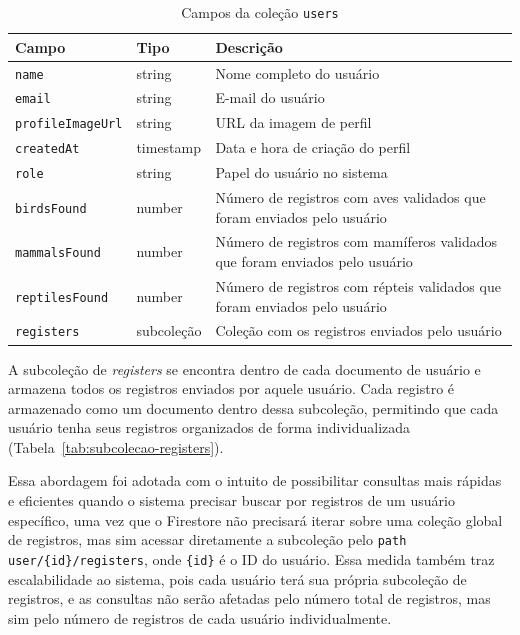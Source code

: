 \begin{table}[H]
    \centering
    \caption{Campos da coleção \texttt{users}}
    \label{tab:firestore-users}
    \begin{tabular}{|>{\raggedright\arraybackslash}p{3.5cm}|
                    >{\raggedright\arraybackslash}p{2cm}|
                    >{\raggedright\arraybackslash}p{7cm}|}
        \hline
        \textbf{Campo} & \textbf{Tipo} & \textbf{Descrição} \\ \hline
        \texttt{name} & string & Nome completo do usuário \\ \hline
        \texttt{email} & string & E-mail do usuário \\ \hline
        \texttt{profileImageUrl} & string & URL da imagem de perfil \\ \hline
        \texttt{createdAt} & timestamp & Data e hora de criação do perfil \\ \hline
        \texttt{role} & string & Papel do usuário no sistema \\ \hline
        \texttt{birdsFound} & number & Número de registros com aves validados que foram enviados pelo usuário \\ \hline
        \texttt{mammalsFound} & number & Número de registros com mamíferos validados que foram enviados pelo usuário \\ \hline
        \texttt{reptilesFound} & number & Número de registros com répteis validados que foram enviados pelo usuário \\ \hline
        \texttt{registers} & subcoleção & Coleção com os registros enviados pelo usuário \\ \hline
    \end{tabular}
\end{table}

A subcoleção de \textit{registers} se encontra dentro de cada documento de usuário e armazena
todos os registros enviados por aquele usuário. Cada registro é armazenado como um documento
dentro dessa subcoleção, permitindo que cada usuário tenha seus registros 
organizados de forma individualizada (Tabela~\ref{tab:subcolecao-registers}).

Essa abordagem foi adotada com o intuito de possibilitar consultas mais 
rápidas e eficientes quando o sistema precisar buscar por registros de um 
usuário específico, uma vez que o Firestore não precisará iterar sobre uma coleção 
global de registros, mas sim acessar diretamente a subcoleção pelo \texttt{path} 
\texttt{user/\{id\}/registers}, onde \texttt{\{id\}} é o ID do usuário. Essa medida também 
traz escalabilidade ao sistema, pois cada usuário terá sua própria
subcoleção de registros, e as consultas não serão afetadas pelo número 
total de registros, mas sim pelo número de registros de cada usuário individualmente.

